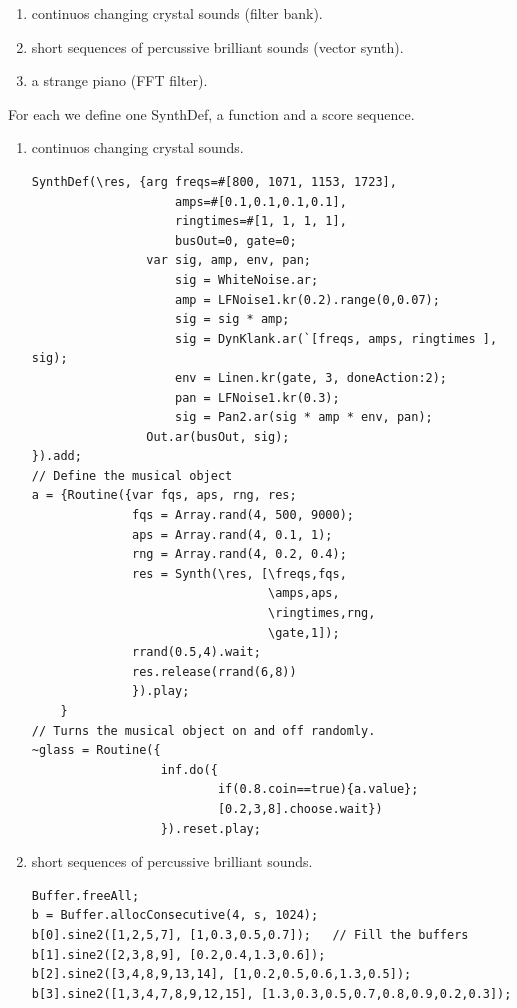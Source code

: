 \begin{enumerate}
\def\labelenumi{\arabic{enumi}.}
\tightlist
\item continuos changing crystal sounds (filter bank). 
\item short sequences of percussive brilliant sounds (vector synth). 
\item a strange piano (FFT filter).
\end{enumerate}

For each we define one SynthDef, a function and a score sequence.

\begin{enumerate}
\def\labelenumi{\arabic{enumi}.}
\tightlist
\item continuos changing crystal sounds.

\begin{lstlisting}[frame=single] 
SynthDef(\res, {arg freqs=#[800, 1071, 1153, 1723],
                    amps=#[0.1,0.1,0.1,0.1],
                    ringtimes=#[1, 1, 1, 1],
                    busOut=0, gate=0;
                var sig, amp, env, pan;
                    sig = WhiteNoise.ar;  
                    amp = LFNoise1.kr(0.2).range(0,0.07); 
                    sig = sig * amp;      
                    sig = DynKlank.ar(`[freqs, amps, ringtimes ], sig);
                    env = Linen.kr(gate, 3, doneAction:2);
                    pan = LFNoise1.kr(0.3);          
                    sig = Pan2.ar(sig * amp * env, pan); 
                Out.ar(busOut, sig);
}).add;
// Define the musical object
a = {Routine({var fqs, aps, rng, res; 
              fqs = Array.rand(4, 500, 9000);
              aps = Array.rand(4, 0.1, 1);
              rng = Array.rand(4, 0.2, 0.4);
              res = Synth(\res, [\freqs,fqs,
                                 \amps,aps,
                                 \ringtimes,rng,
                                 \gate,1]);
              rrand(0.5,4).wait;
              res.release(rrand(6,8)) 
              }).play;
    }
// Turns the musical object on and off randomly.  
~glass = Routine({
                  inf.do({
                          if(0.8.coin==true){a.value}; 
                          [0.2,3,8].choose.wait})
                  }).reset.play;
\end{lstlisting}

\item short sequences of percussive brilliant sounds.

\begin{lstlisting}[frame=single] 
Buffer.freeAll;
b = Buffer.allocConsecutive(4, s, 1024);  
b[0].sine2([1,2,5,7], [1,0.3,0.5,0.7]);   // Fill the buffers
b[1].sine2([2,3,8,9], [0.2,0.4,1.3,0.6]);
b[2].sine2([3,4,8,9,13,14], [1,0.2,0.5,0.6,1.3,0.5]);
b[3].sine2([1,3,4,7,8,9,12,15], [1.3,0.3,0.5,0.7,0.8,0.9,0.2,0.3]);


\end{lstlisting}
\end{enumerate}
